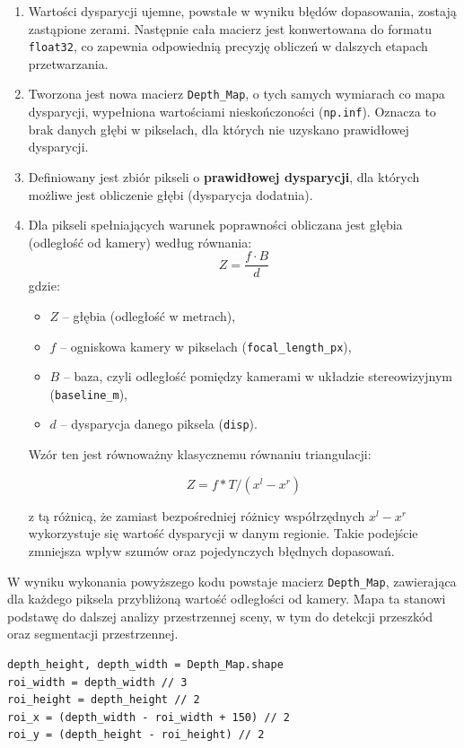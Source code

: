 \documentclass[magisterska]{pracadypl}
\begin{document}
\begin{enumerate}
    \item Wartości dysparycji ujemne, powstałe w wyniku błędów dopasowania, zostają zastąpione zerami. Następnie cała macierz jest konwertowana do formatu \texttt{float32}, co zapewnia odpowiednią precyzję obliczeń w dalszych etapach przetwarzania.

    \item Tworzona jest nowa macierz \texttt{Depth\_Map}, o tych samych wymiarach co mapa dysparycji, wypełniona wartościami nieskończoności (\texttt{np.inf}). Oznacza to brak danych głębi w pikselach, dla których nie uzyskano prawidłowej dysparycji.

    \item Definiowany jest zbiór pikseli o \textbf{prawidłowej dysparycji}, dla których możliwe jest obliczenie głębi (dysparycja dodatnia).

    \item Dla pikseli spełniających warunek poprawności obliczana jest głębia (odległość od kamery) według równania:
    \[
    Z = \frac{f \cdot B}{d}
    \]
    gdzie:
    \begin{itemize}
        \item \( Z \) – głębia (odległość w metrach),
        \item \( f \) – ogniskowa kamery w pikselach (\texttt{focal\_length\_px}),
        \item \( B \) – baza, czyli odległość pomiędzy kamerami w układzie stereowizyjnym (\texttt{baseline\_m}),
        \item \( d \) – dysparycja danego piksela (\texttt{disp}).
    \end{itemize}
Wzór ten jest równoważny klasycznemu równaniu triangulacji:

\[Z=f*T/(x^l-x^r)\]

z tą różnicą, że zamiast bezpośredniej różnicy współrzędnych $x^l - x^r$ wykorzystuje się wartość dysparycji w danym regionie. Takie podejście zmniejsza wpływ szumów oraz pojedynczych błędnych dopasowań.
\end{enumerate}

\noindent
W wyniku wykonania powyższego kodu powstaje macierz \texttt{Depth\_Map}, zawierająca dla każdego piksela przybliżoną wartość odległości od kamery. Mapa ta stanowi podstawę do dalszej analizy przestrzennej sceny, w tym do detekcji przeszkód oraz segmentacji przestrzennej.

\begin{lstlisting}[style=mypython]
depth_height, depth_width = Depth_Map.shape
roi_width = depth_width // 3
roi_height = depth_height // 2
roi_x = (depth_width - roi_width + 150) // 2
roi_y = (depth_height - roi_height) // 2
\end{lstlisting}
\end{document}
